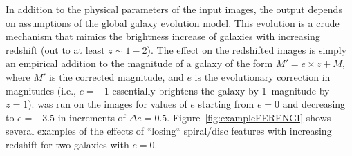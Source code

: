 \documentclass[twocolumn]{aastex6}
\begin{document}

In addition to the physical parameters of the input images, the \ferengi{} output depends on assumptions of the global galaxy evolution model. This evolution is a crude mechanism that mimics the brightness increase of galaxies with increasing redshift (out to at least $z\sim1-2$). The effect on the redshifted images is simply an empirical addition to the magnitude of a galaxy of the form $M' = e\times z + M$, where $M'$ is the corrected magnitude, and $e$ is the evolutionary correction in magnitudes (i.e., $e=-1$ essentially brightens the galaxy by 1~magnitude by $z=1$). \ferengi{} was run on the images for values of $e$ starting from $e=0$ and decreasing to $e=-3.5$ in increments of $\Delta e = 0.5$. Figure~\ref{fig:exampleFERENGI} shows several examples of the effects of ``losing`` spiral/disc features with increasing redshift for two galaxies with $e=0$. 
\end{document}
